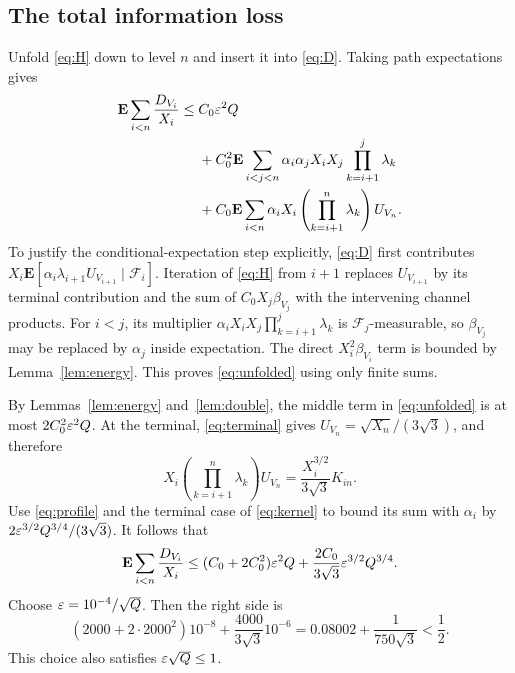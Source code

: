 \subsection{The total information loss}
Unfold \eqref{eq:H} down to level $n$ and insert it into
\eqref{eq:D}. Taking path expectations gives
\begin{align}
 \mathbf E\sum_{i<n}\frac{D_{V_i}}{X_i}
 \leq{}& C_0\varepsilon^2Q\notag\\
 &+C_0^2\mathbf E\sum_{i<j<n}\alpha_i\alpha_jX_iX_j
                          \prod_{k=i+1}^j\lambda_k\notag\\
 &+C_0\mathbf E\sum_{i<n}\alpha_iX_i
                \left(\prod_{k=i+1}^n\lambda_k\right)U_{V_n}.
                \label{eq:unfolded}
\end{align}
To justify the conditional-expectation step explicitly,
\eqref{eq:D} first contributes
$X_i\mathbf E[\alpha_i\lambda_{i+1}U_{V_{i+1}}\mid\mathcal F_i]$.
Iteration of \eqref{eq:H} from $i+1$ replaces $U_{V_{i+1}}$
by its terminal contribution and the sum of
$C_0X_j\beta_{V_j}$ with the intervening channel products.
For $i<j$, its multiplier
$\alpha_iX_iX_j\prod_{k=i+1}^j\lambda_k$ is
$\mathcal F_j$-measurable, so $\beta_{V_j}$ may be replaced by
$\alpha_j$ inside expectation. The direct $X_i^2\beta_{V_i}$
term is bounded by Lemma~\ref{lem:energy}. This proves
\eqref{eq:unfolded} using only finite sums.

By Lemmas~\ref{lem:energy} and~\ref{lem:double}, the middle
term in \eqref{eq:unfolded} is at most $2C_0^2\varepsilon^2Q$.
At the terminal, \eqref{eq:terminal} gives
$U_{V_n}=\sqrt{X_n}/(3\sqrt3)$, and therefore
\[
 X_i\left(\prod_{k=i+1}^n\lambda_k\right)U_{V_n}
       =\frac{X_i^{3/2}}{3\sqrt3}K_{in}.
\]
Use \eqref{eq:profile} and the terminal case of
\eqref{eq:kernel} to bound its sum with $\alpha_i$ by
$2\varepsilon^{3/2}Q^{3/4}/(3\sqrt3)$. It follows that
\begin{equation}\label{eq:loss}
 \mathbf E\sum_{i<n}\frac{D_{V_i}}{X_i}
 \leq(C_0+2C_0^2)\varepsilon^2Q
             +\frac{2C_0}{3\sqrt3}\varepsilon^{3/2}Q^{3/4}.
\end{equation}
Choose $\varepsilon=10^{-4}/\sqrt Q$. Then the right side is
\[
 (2000+2\cdot2000^2)10^{-8}
       +\frac{4000}{3\sqrt3}10^{-6}
 =0.08002+\frac1{750\sqrt3}<\frac12.
\]
This choice also satisfies $\varepsilon\sqrt Q\leq1$.

